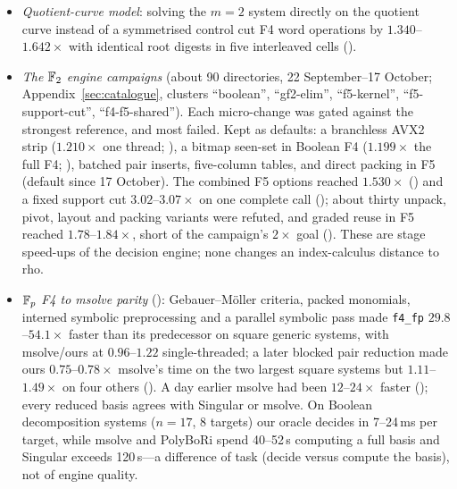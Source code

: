 \begin{itemize}
  claimed for these.
\item \emph{Quotient-curve model}: solving the $m=2$ system directly on
  the quotient curve instead of a symmetrised control cut F4 word
  operations by $1.340$--$1.642\times$ with identical root digests in five
  interleaved cells ().
\item \emph{The $\mathbb{F}_2$ engine campaigns} (about 90 directories,
  22 September--17 October; Appendix~\ref{sec:catalogue}, clusters
  ``boolean'', ``gf2-elim'', ``f5-kernel'', ``f5-support-cut'',
  ``f4-f5-shared''). Each micro-change was gated against the strongest
  reference, and most failed. Kept as defaults: a branchless AVX2 strip
  ($1.210\times$ one thread; ),
  a bitmap seen-set in Boolean F4 ($1.199\times$ the full F4;
  ), batched pair inserts,
  five-column tables, and direct packing in F5 (default since 17 October).
  The combined F5 options reached $1.530\times$
  () and a fixed support cut
  $3.02$--$3.07\times$ on one complete call
  (); about thirty unpack,
  pivot, layout and packing variants were refuted, and graded reuse in F5
  reached $1.78$--$1.84\times$, short of the campaign's $2\times$ goal
  (). These are stage
  speed-ups of the decision engine; none changes an index-calculus
  distance to rho.
\item \emph{$\mathbb{F}_p$ F4 to msolve parity}
  (): Gebauer--M\"oller
  criteria, packed monomials, interned symbolic preprocessing and a
  parallel symbolic pass made \texttt{f4\_fp} $29.8$--$54.1\times$ faster
  than its predecessor on square generic systems, with msolve/ours at
  $0.96$--$1.22$ single-threaded; a later blocked pair reduction made ours
  $0.75$--$0.78\times$ msolve's time on the two largest square systems but
  $1.11$--$1.49\times$ on four others
  (). A day earlier msolve had been
  $12$--$24\times$ faster ();
  every reduced basis agrees with Singular or msolve. On Boolean
  decomposition systems ($n=17$, 8 targets) our oracle decides in
  7--24\,ms per target, while msolve and PolyBoRi spend 40--52\,s computing
  a full basis and Singular exceeds 120\,s---a difference of task (decide
  versus compute the basis), not of engine quality.
\end{itemize}

